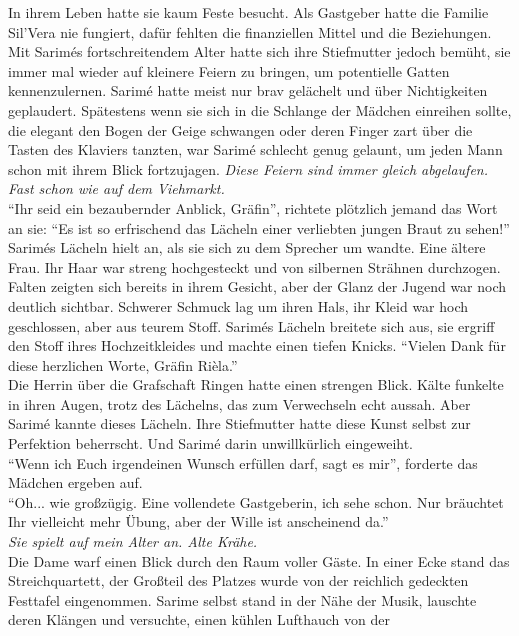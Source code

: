 In ihrem Leben hatte sie kaum Feste besucht. Als Gastgeber hatte die Familie Sil'Vera nie fungiert, 
dafür fehlten die finanziellen Mittel und die Beziehungen. Mit Sarimés fortschreitendem Alter hatte 
sich ihre Stiefmutter jedoch bemüht, sie immer mal wieder auf kleinere Feiern zu bringen, um 
potentielle Gatten kennenzulernen. Sarimé hatte meist nur brav gelächelt und über Nichtigkeiten 
geplaudert. Spätestens wenn sie sich in die Schlange der Mädchen einreihen sollte, die elegant den 
Bogen der Geige schwangen oder deren Finger zart über die Tasten des Klaviers tanzten, war Sarimé 
schlecht genug gelaunt, um jeden Mann schon mit ihrem Blick fortzujagen. \textit{Diese Feiern sind 
immer gleich abgelaufen. Fast schon wie auf dem Viehmarkt.}\\
``Ihr seid ein bezaubernder Anblick, Gräfin'', richtete plötzlich jemand das Wort an sie: ``Es ist 
so erfrischend das Lächeln einer verliebten jungen Braut zu sehen!''\\
Sarimés Lächeln hielt an, als sie sich zu dem Sprecher um wandte. Eine ältere Frau. Ihr Haar war 
streng hochgesteckt und von silbernen Strähnen durchzogen. Falten zeigten sich bereits in ihrem 
Gesicht, aber der Glanz der Jugend war noch deutlich sichtbar. Schwerer Schmuck lag um ihren 
Hals, ihr Kleid war hoch geschlossen, aber aus teurem Stoff. Sarimés Lächeln breitete sich aus, sie 
ergriff den Stoff ihres Hochzeitkleides und machte einen tiefen Knicks. ``Vielen Dank für diese 
herzlichen Worte, Gräfin Rièla.''\\
Die Herrin über die Grafschaft Ringen hatte einen strengen Blick. Kälte funkelte in ihren Augen, 
trotz des Lächelns, das zum Verwechseln echt aussah. Aber Sarimé kannte dieses Lächeln. Ihre 
Stiefmutter hatte diese Kunst selbst zur Perfektion beherrscht. Und Sarimé darin unwillkürlich 
eingeweiht.\\
``Wenn ich Euch irgendeinen Wunsch erfüllen darf, sagt es mir'', forderte das Mädchen ergeben auf.\\
``Oh... wie großzügig. Eine vollendete Gastgeberin, ich sehe schon. Nur bräuchtet Ihr vielleicht 
mehr Übung, aber der Wille ist anscheinend da.'' \\
\textit{Sie spielt auf mein Alter an. Alte Krähe.}\\
Die Dame warf einen Blick durch den Raum voller Gäste. In einer Ecke stand das Streichquartett, der 
Großteil des Platzes wurde von der reichlich gedeckten Festtafel eingenommen. Sarime selbst stand 
in der Nähe der Musik, lauschte deren Klängen und versuchte, einen kühlen Lufthauch von der 
